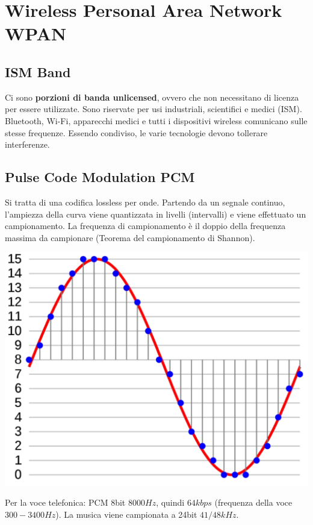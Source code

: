 
\section{Wireless Personal Area Network WPAN}

\subsection{ISM Band}
Ci sono \textbf{porzioni di banda unlicensed}, ovvero che non necessitano di licenza per essere utilizzate. Sono riservate per usi industriali, scientifici e medici (ISM).\\

Bluetooth, Wi-Fi, apparecchi medici e tutti i dispositivi wireless comunicano sulle stesse frequenze. Essendo condiviso, le varie tecnologie devono tollerare interferenze.\\

\subsection{Pulse Code Modulation PCM}
Si tratta di una codifica lossless per onde. Partendo da un segnale continuo, l'ampiezza della curva viene quantizzata in livelli (intervalli) e viene effettuato un campionamento. La frequenza di campionamento è il doppio della frequenza massima da campionare (Teorema del campionamento di Shannon).

\begin{center}
	\includegraphics[width=0.7\linewidth]{img/wpan/PCM}
\end{center}

Per la voce telefonica: PCM 8bit $8000Hz$, quindi $64kbps$ (frequenza della voce $300 - 3400 Hz$). La musica viene campionata a 24bit $41/48kHz$.\\

